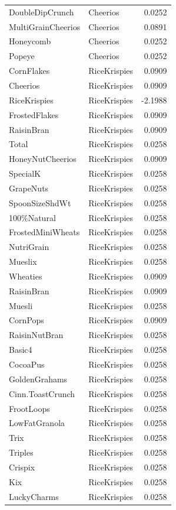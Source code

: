 \begin{longtable}{llr}
DoubleDipCrunch & Cheerios & 0.0252 \\
MultiGrainCheerios & Cheerios & 0.0891 \\
Honeycomb & Cheerios & 0.0252 \\
Popeye & Cheerios & 0.0252 \\
CornFlakes & RiceKrispies & 0.0909 \\
Cheerios & RiceKrispies & 0.0909 \\
RiceKrispies & RiceKrispies & -2.1988 \\
FrostedFlakes & RiceKrispies & 0.0909 \\
RaisinBran & RiceKrispies & 0.0909 \\
Total & RiceKrispies & 0.0258 \\
HoneyNutCheerios & RiceKrispies & 0.0909 \\
SpecialK & RiceKrispies & 0.0258 \\
GrapeNuts & RiceKrispies & 0.0258 \\
SpoonSizeShdWt & RiceKrispies & 0.0258 \\
100\%Natural & RiceKrispies & 0.0258 \\
FrostedMiniWheats & RiceKrispies & 0.0258 \\
NutriGrain & RiceKrispies & 0.0258 \\
Mueslix & RiceKrispies & 0.0258 \\
Wheaties & RiceKrispies & 0.0909 \\
RaisinBran & RiceKrispies & 0.0909 \\
Muesli & RiceKrispies & 0.0258 \\
CornPops & RiceKrispies & 0.0909 \\
RaisinNutBran & RiceKrispies & 0.0258 \\
Basic4 & RiceKrispies & 0.0258 \\
CocoaPus & RiceKrispies & 0.0258 \\
GoldenGrahams & RiceKrispies & 0.0258 \\
Cinn.ToastCrunch & RiceKrispies & 0.0258 \\
FrootLoops & RiceKrispies & 0.0258 \\
LowFatGranola & RiceKrispies & 0.0258 \\
Trix & RiceKrispies & 0.0258 \\
Triples & RiceKrispies & 0.0258 \\
Crispix & RiceKrispies & 0.0258 \\
Kix & RiceKrispies & 0.0258 \\
LuckyCharms & RiceKrispies & 0.0258 \\

\end{longtable}
